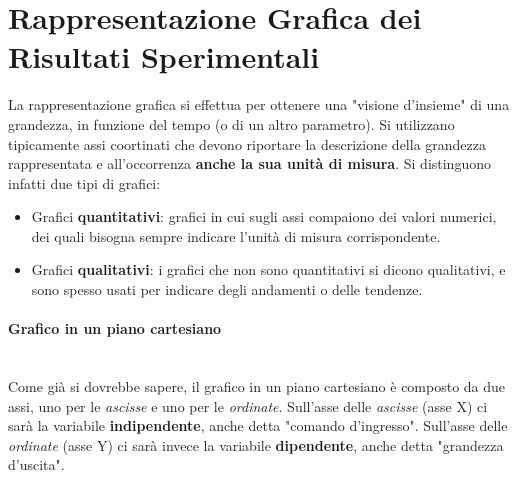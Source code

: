 \documentclass[a4paper,11pt]{report}
\begin{document}
\section{Rappresentazione Grafica dei Risultati Sperimentali}
La rappresentazione grafica si effettua per ottenere una "visione d'insieme" di una grandezza, in funzione del tempo (o di un altro parametro). Si utilizzano tipicamente assi coortinati che devono riportare la descrizione della grandezza rappresentata e all'occorrenza \textbf{anche la sua unità di misura}.
Si distinguono infatti due tipi di grafici:
\begin{itemize}
  \item Grafici \textbf{quantitativi}: grafici in cui sugli assi compaiono dei valori numerici, dei quali bisogna sempre indicare l'unità di misura corrispondente.
  \item Grafici \textbf{qualitativi}: i grafici che non sono quantitativi si dicono qualitativi, e sono spesso usati per indicare degli andamenti o delle tendenze.
\end{itemize}
\paragraph{Grafico in un piano cartesiano}~\\
Come già si dovrebbe sapere, il grafico in un piano cartesiano è composto da due assi, uno per le \textit{ascisse} e uno per le \textit{ordinate}. Sull'asse delle \textit{ascisse} (asse X) ci sarà la variabile \textbf{indipendente}, anche detta "comando d'ingresso". Sull'asse delle \textit{ordinate} (asse Y) ci sarà invece la variabile \textbf{dipendente}, anche detta "grandezza d'uscita".
\end{document}
